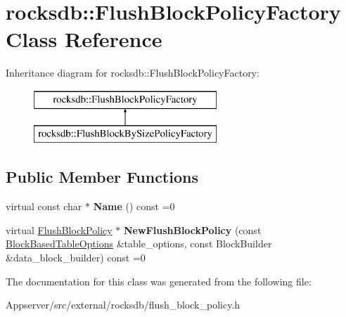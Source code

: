 \hypertarget{classrocksdb_1_1FlushBlockPolicyFactory}{}\section{rocksdb\+:\+:Flush\+Block\+Policy\+Factory Class Reference}
\label{classrocksdb_1_1FlushBlockPolicyFactory}
Inheritance diagram for rocksdb\+:\+:Flush\+Block\+Policy\+Factory\+:\begin{figure}[H]
\begin{center}
\leavevmode
\includegraphics[height=2.000000cm]{classrocksdb_1_1FlushBlockPolicyFactory}
\end{center}
\end{figure}
\subsection*{Public Member Functions}
\begin{DoxyCompactItemize}
\item 
virtual const char $\ast$ {\bfseries Name} () const =0\hypertarget{classrocksdb_1_1FlushBlockPolicyFactory_ac47177388c186c65759cc1fd2d73a5f9}{}\label{classrocksdb_1_1FlushBlockPolicyFactory_ac47177388c186c65759cc1fd2d73a5f9}

\item 
virtual \hyperlink{classrocksdb_1_1FlushBlockPolicy}{Flush\+Block\+Policy} $\ast$ {\bfseries New\+Flush\+Block\+Policy} (const \hyperlink{structrocksdb_1_1BlockBasedTableOptions}{Block\+Based\+Table\+Options} \&table\+\_\+options, const Block\+Builder \&data\+\_\+block\+\_\+builder) const =0\hypertarget{classrocksdb_1_1FlushBlockPolicyFactory_ac4728294425869b3d0f81d15e43200b4}{}\label{classrocksdb_1_1FlushBlockPolicyFactory_ac4728294425869b3d0f81d15e43200b4}

\end{DoxyCompactItemize}


The documentation for this class was generated from the following file\+:\begin{DoxyCompactItemize}
\item 
Appserver/src/external/rocksdb/flush\+\_\+block\+\_\+policy.\+h\end{DoxyCompactItemize}
